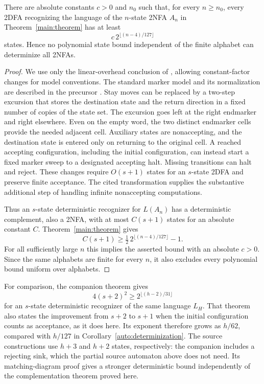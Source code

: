 \begin{corollary}\label{auto:determinization}
There are absolute constants $c>0$ and $n_0$ such that, for every
$n\ge n_0$, every 2DFA recognizing the language of the $n$-state 2NFA
$A_n$ in Theorem~\ref{main:theorem} has at least
\[
 c\,2^{\lfloor(n-4)/127\rfloor}
\]
states. Hence no polynomial state bound independent of the finite
alphabet can determinize all 2NFAs.
\end{corollary}
\begin{proof}
We use only the linear-overhead conclusion of
\cite{GeffertMereghettiPighizzini2007}, allowing constant-factor changes
for model conventions. The standard marker model and its normalization
are described in the precursor \cite[Section~2 and Lemma~3.1]{GeffertMereghettiPighizzini2005}.
Stay moves can be replaced by a two-step
excursion that stores the destination state and the return direction
in a fixed number of copies of the state set. The excursion goes left
at the right endmarker and right elsewhere. Even on the empty word,
the two distinct endmarker cells provide the needed adjacent cell.
Auxiliary states are nonaccepting, and the destination state is entered
only on returning to the original cell. A reached accepting
configuration, including the initial configuration, can instead start
a fixed marker sweep to a designated accepting halt. Missing
transitions can halt and reject. These changes require $O(s+1)$ states
for an $s$-state 2DFA and preserve finite acceptance. The cited
transformation supplies the substantive additional step of handling
infinite nonaccepting computations.

Thus an $s$-state deterministic recognizer for $L(A_n)$ has a
deterministic complement, also a 2NFA, with at most $C(s+1)$ states
for an absolute constant $C$. Theorem~\ref{main:theorem} gives
\[
 C(s+1)\ge \tfrac12\,2^{\lfloor(n-4)/127\rfloor}-1.
\]
For all sufficiently large $n$ this implies the asserted bound with
an absolute $c>0$. Since the same alphabets are finite for every $n$,
it also excludes every polynomial bound uniform over alphabets.
\end{proof}

For comparison, the companion theorem
\cite[Theorem~1.1]{CompanionDeterminization2026} gives
\[
 4(s+2)^2\geq 2^{\lfloor(h-2)/31\rfloor}
\]
for an $s$-state deterministic recognizer of the same language $L_H$.
That theorem also states the improvement from $s+2$ to $s+1$ when the
initial configuration counts as acceptance, as it does here. Its
exponent therefore grows as $h/62$, compared with $h/127$ in
Corollary~\ref{auto:determinization}. The source constructions use
$h+3$ and $h+2$ states, respectively: the companion includes a rejecting
sink, which the partial source automaton above does not need. Its
matching-diagram proof gives a stronger deterministic bound independently
of the complementation theorem proved here.
